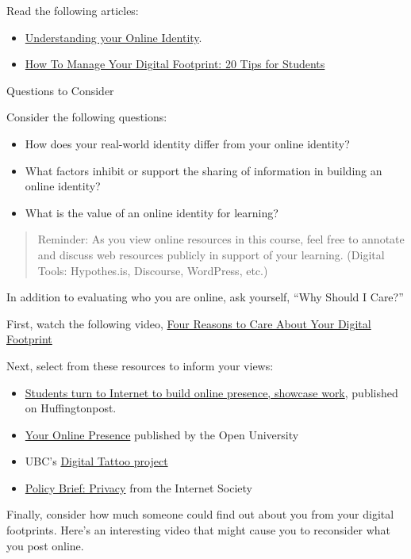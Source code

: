 \documentclass[
]{book}
\providecommand{\tightlist}{%
  \setlength{\itemsep}{0pt}\setlength{\parskip}{0pt}}
\theoremstyle{definition}
\theoremstyle{definition}
\theoremstyle{definition}
\theoremstyle{definition}
\theoremstyle{remark}
\begin{document}
\begin{reflect}
Read the following articles:

\begin{itemize}
\tightlist
\item
  \href{assets/u4/U4_Understanding-your-Online-Identity-An-Overview-of-Identity.pdf}{Understanding your Online Identity}.
\item
  \href{https://research.com/education/how-to-manage-digital-footprint}{How To Manage Your Digital Footprint: 20 Tips for Students}
\end{itemize}

{Questions to Consider}

Consider the following questions:

\begin{itemize}
\tightlist
\item
  How does your real-world identity differ from your online identity?\\
\item
  What factors inhibit or support the sharing of information in building an online identity?\\
\item
  What is the value of an online identity for learning?
\end{itemize}

\begin{quote}
Reminder: As you view online resources in this course, feel free to annotate and discuss web resources publicly in support of your learning. (Digital Tools: Hypothes.is, Discourse, WordPress, etc.)
\end{quote}

In addition to evaluating who you are online, ask yourself, ``Why Should I Care?''

First, watch the following video, \href{https://www.youtube.com/watch?v=Ro_LlRg8rGg}{Four Reasons to Care About Your Digital Footprint}

Next, select from these resources to inform your views:

\begin{itemize}
\tightlist
\item
  \href{https://www.huffpost.com/entry/students-turn-to-internet_b_3518598}{Students turn to Internet to build online presence, showcase work}, published on Huffingtonpost.
\item
  \href{https://help.open.ac.uk/your-online-presence}{Your Online Presence} published by the Open University
\item
  UBC's \href{https://digitaltattoo.ubc.ca/}{Digital Tattoo project}
\item
  \href{https://www.internetsociety.org/policybriefs/privacy/}{Policy Brief: Privacy} from the Internet Society
\end{itemize}

Finally, consider how much someone could find out about you from your digital footprints. Here's an interesting video that might cause you to reconsider what you post online.
\end{reflect}
\end{document}
